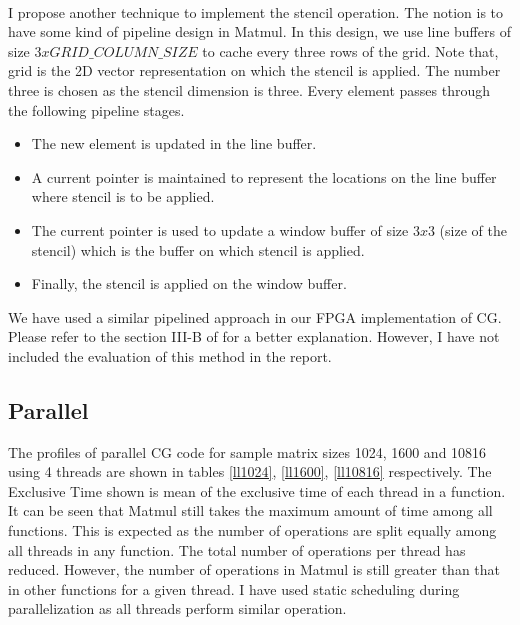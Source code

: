 \documentclass{article}
\begin{document}
\begin{spacing}{1.1}
\\
I propose another technique to implement the stencil operation. The notion is to have some kind of pipeline design in Matmul. In this design, we use line buffers of size $3xGRID\_ COLUMN\_SIZE$ to cache every three rows of the grid. Note that, grid is the 2D vector representation on which the stencil is applied. The number three is chosen as the stencil dimension is three. Every element passes through the following pipeline stages.
\begin{itemize}
    \item The new element is updated in the line buffer.
    \item A current pointer is maintained to represent the locations on the line buffer where stencil is to be applied.
    \item The current pointer is used to update a window buffer of size $3x3$ (size of the stencil) which is the buffer on which stencil is applied.
    \item Finally, the stencil is applied on the window buffer.
\end{itemize}
We have used a similar pipelined approach in our FPGA implementation of CG. Please refer to the section III-B of \cite{FPGACG} for a better explanation. However, I have not included the evaluation of this method in the report.

\subsection{Parallel}

The profiles of parallel CG code for sample matrix sizes 1024, 1600 and 10816 using 4 threads are shown in tables \ref{ll1024}, \ref{ll1600}, \ref{ll10816} respectively. The Exclusive Time shown is mean of the exclusive time of each thread in a function. It can be seen that Matmul still takes the maximum amount of time among all functions. This is expected as the number of operations are split equally among all threads in any function. The total number of operations per thread has reduced. However, the number of operations in Matmul is still greater than that in other functions for a given thread. I have used static scheduling during parallelization as all threads perform similar operation. 


\end{spacing}
\end{document}
